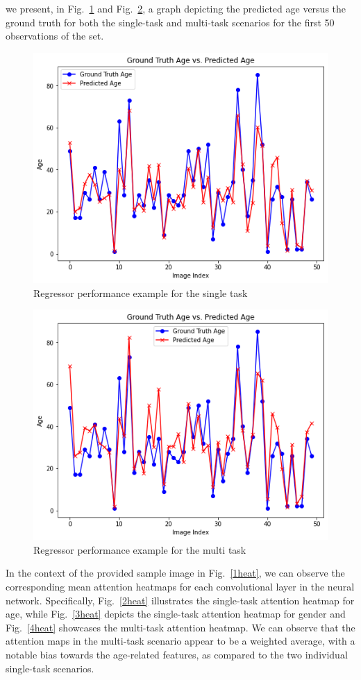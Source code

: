 we present, in Fig.~\ref{8reg} and Fig.~\ref{9reg},
a graph depicting the predicted age versus the ground truth
for both the single-task and multi-task scenarios for the first
50 observations of the set.
\begin{figure}[htbp]
    \centerline{\includegraphics[width=.45\textwidth]{images/testing/reg_single.png}}
    \caption{Regressor performance example for the single task}
    \label{8reg}
\end{figure}
\begin{figure}[htbp]
    \centerline{\includegraphics[width=.45\textwidth]{images/testing/reg_multi.png}}
    \caption{Regressor performance example for the multi task}
    \label{9reg}
\end{figure}

In the context of the provided sample image in Fig.~\ref{1heat},
we can observe the corresponding mean attention heatmaps
for each convolutional layer in the neural network.
Specifically, Fig.~\ref{2heat} illustrates the single-task attention
heatmap for age, while Fig.~\ref{3heat} depicts the single-task
attention heatmap for gender and
Fig.~\ref{4heat} showcases the multi-task attention heatmap.
We can observe that the attention maps in the multi-task
scenario appear to be a weighted average,
with a notable bias towards the age-related features,
as compared to the two individual single-task scenarios.

